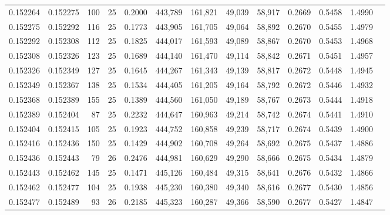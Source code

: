 \begin{tabular}{rrrrrrrrrrrrr}
0.152264 & 0.152275 &   100 &  25 &                                     0.2000 & 443,789 & 161,821 &  49,039 &  58,917 & 0.2669 & 0.5458 & 1.4990 \\
0.152275 & 0.152292 &   116 &  25 &                                     0.1773 & 443,905 & 161,705 &  49,064 &  58,892 & 0.2670 & 0.5455 & 1.4979 \\
0.152292 & 0.152308 &   112 &  25 &                                     0.1825 & 444,017 & 161,593 &  49,089 &  58,867 & 0.2670 & 0.5453 & 1.4968 \\
0.152308 & 0.152326 &   123 &  25 &                                     0.1689 & 444,140 & 161,470 &  49,114 &  58,842 & 0.2671 & 0.5451 & 1.4957 \\
0.152326 & 0.152349 &   127 &  25 &                                     0.1645 & 444,267 & 161,343 &  49,139 &  58,817 & 0.2672 & 0.5448 & 1.4945 \\
0.152349 & 0.152367 &   138 &  25 &                                     0.1534 & 444,405 & 161,205 &  49,164 &  58,792 & 0.2672 & 0.5446 & 1.4932 \\
0.152368 & 0.152389 &   155 &  25 &                                     0.1389 & 444,560 & 161,050 &  49,189 &  58,767 & 0.2673 & 0.5444 & 1.4918 \\
0.152389 & 0.152404 &    87 &  25 &                                     0.2232 & 444,647 & 160,963 &  49,214 &  58,742 & 0.2674 & 0.5441 & 1.4910 \\
0.152404 & 0.152415 &   105 &  25 &                                     0.1923 & 444,752 & 160,858 &  49,239 &  58,717 & 0.2674 & 0.5439 & 1.4900 \\
0.152416 & 0.152436 &   150 &  25 &                                     0.1429 & 444,902 & 160,708 &  49,264 &  58,692 & 0.2675 & 0.5437 & 1.4886 \\
0.152436 & 0.152443 &    79 &  26 &                                     0.2476 & 444,981 & 160,629 &  49,290 &  58,666 & 0.2675 & 0.5434 & 1.4879 \\
0.152443 & 0.152462 &   145 &  25 &                                     0.1471 & 445,126 & 160,484 &  49,315 &  58,641 & 0.2676 & 0.5432 & 1.4866 \\
0.152462 & 0.152477 &   104 &  25 &                                     0.1938 & 445,230 & 160,380 &  49,340 &  58,616 & 0.2677 & 0.5430 & 1.4856 \\
0.152477 & 0.152489 &    93 &  26 &                                     0.2185 & 445,323 & 160,287 &  49,366 &  58,590 & 0.2677 & 0.5427 & 1.4847 \\

\end{tabular}
